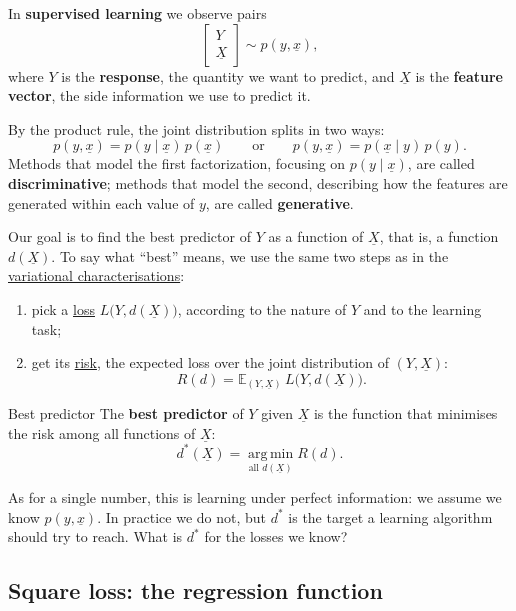 \documentclass[a4paper,12pt,oneside]{report}
\begin{document}
In \textbf{supervised learning} we observe pairs
\[
\begin{bmatrix}Y\\ \underline{X}\end{bmatrix}\sim p(y,\underline{x}),
\]
where $Y$ is the \textbf{response}, the quantity we want to predict, and
$\underline{X}$ is the \textbf{feature vector}, the side information we
use to predict it.

By the product rule, the joint distribution splits in
two ways:
\[
p(y,\underline{x})=p(y\mid\underline{x})\,p(\underline{x})
\qquad\text{or}\qquad
p(y,\underline{x})=p(\underline{x}\mid y)\,p(y).
\]
Methods that model the first factorization, focusing on
$p(y\mid\underline{x})$, are called \textbf{discriminative}; methods that
model the second, describing how the features are generated within each
value of $y$, are called \textbf{generative}.

Our goal is to find the best predictor of $Y$ as a function of
$\underline{X}$, that is, a function $d(\underline{X})$. To say what
``best'' means, we use the same two steps as in the
\hyperref[sec:variational]{variational characterisations}:
\begin{enumerate}
\item pick a \hyperref[def:loss]{loss} $L\big(Y,d(\underline{X})\big)$,
according to the nature of $Y$ and to the learning task;
\item get its \hyperref[def:risk]{risk}, the expected loss over the joint
distribution of $(Y,\underline{X})$:
\[
R(d)=\mathbb{E}_{(Y,\underline{X})}\,L\big(Y,d(\underline{X})\big).
\]
\end{enumerate}

\begin{frameddefn}{Best predictor}\label{def:best-predictor}
The \textbf{best predictor} of $Y$ given $\underline{X}$ is the function
that minimises the risk among all functions of $\underline{X}$:
\[
d^*(\underline{X})=\operatorname*{arg\,min}_{\text{all }d(\underline{X})}R(d).
\]
\end{frameddefn}

As for a single number, this is learning under perfect information: we
assume we know $p(y,\underline{x})$. In practice we do not, but $d^*$ is
the target a learning algorithm should try to reach. What is $d^*$ for
the losses we know?

\subsection{Square loss: the regression function}
\end{document}
